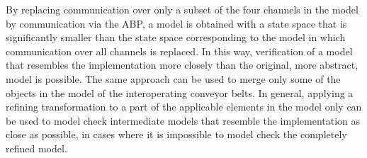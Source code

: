By replacing communication over only a subset of the four channels in the model by communication via the ABP, a model is obtained with a state space that is significantly smaller than the state space corresponding to the model in which communication over all channels is replaced.
In this way, verification of a model that resembles the implementation more closely than the original, more abstract, model is possible.
The same approach can be used to merge only some of the objects in the model of the interoperating conveyor belts.
In general, applying a refining transformation to a part of the applicable elements in the model only can be used to model check intermediate models that resemble the implementation as close as possible, in cases where it is impossible to model check the completely refined model. 